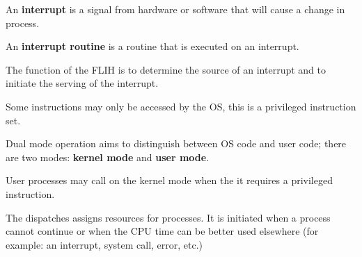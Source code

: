 \begin{definition}[Interrupt]
    An \textbf{interrupt} is a signal from hardware or software that will cause a change in process.
\end{definition}

\begin{definition} 
    An \textbf{interrupt routine} is a routine that is executed on an interrupt.
\end{definition}

The function of the FLIH is to determine the source of an interrupt and to initiate the serving of the interrupt.

Some instructions may only be accessed by the OS, this is a privileged instruction set. 

\begin{definition}
    Dual mode operation aims to distinguish between OS code and user code; there are two modes: \textbf{kernel mode} and \textbf{user mode}.
\end{definition}

User processes may call on the kernel mode when the it requires a privileged instruction. %

The dispatches assigns resources for processes. It is initiated when a process cannot continue or when the CPU time can be better used elsewhere (for example: an interrupt, system call, error, etc.)

